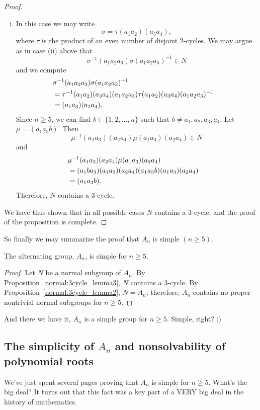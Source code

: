{\begin{proof}
\begin{enumerate}[(i)]
\item 
In this case we may write
\[
\sigma = \tau (a_1 a_2) (a_3 a_4),
\]
where $\tau$ is the product of an even number of disjoint 2-cycles.
We may argue as in case (ii) above that
\[
\sigma^{-1}(a_1 a_2 a_3)\sigma(a_1 a_2 a_3)^{-1} \in N
\]
and we compute
\begin{align*}
\lefteqn{\sigma^{-1}(a_1 a_2 a_3)\sigma(a_1 a_2 a_3)^{-1} } \\
& = \tau^{-1} (a_1 a_2) (a_3 a_4) (a_1 a_2 a_3) 
      \tau (a_1 a_2)(a_3 a_4)(a_1 a_2 a_3)^{-1} \\
& = (a_1 a_3)(a_2 a_4).
\end{align*}
Since $n \geq 5$, we can find $b \in \{1, 2, \ldots, n \}$ such that
$b \neq a_1, a_2, a_3, a_4$. Let $\mu = (a_1 a_3 b)$. Then
\[
\mu^{-1} (a_1 a_3)(a_2 a_4) \mu (a_1 a_3)(a_2 a_4) \in N
\]
and
\begin{align*}
\lefteqn{\mu^{-1} (a_1 a_3)(a_2 a_4) \mu (a_1 a_3)(a_2 a_4) } \\
& = (a_1 b a_3)(a_1 a_3)(a_2 a_4) 
      (a_1 a_3 b)(a_1 a_3)(a_2 a_4) \\
& = (a_1 a_3 b ).
\end{align*}
Therefore, $N$ contains a 3-cycle. 
\end{enumerate}
We have thus shown that in all possible cases $N$ contains a 3-cycle, and the  proof of the
proposition is complete.  
\end{proof}
 
So finally we may summarize the proof that $A_n$ is simple $(n \geq 5)$.

\begin{thm}\label{normal:An_simple}
The alternating group, $A_n$, is simple for $n \geq 5$. 
\end{thm}
 
\begin{proof}
Let $N$ be a normal subgroup of $A_n$. By Proposition~\ref{normal:3cycle_lemma3}, $N$ contains a
3-cycle. By Proposition~\ref{normal:3cycle_lemma2}, $N = A_n$; therefore, $A_n$ contains no proper
nontrivial normal subgroups for $n \geq 5$.
\end{proof} 
 
And there we have it, $A_n$ is a simple group for $n \geq 5$.  Simple, right? :)

\subsection{The simplicity of $A_n$ and nonsolvability of polynomial roots}
 We've just spent several pages proving that $A_n$ is simple for $n \ge 5$.  What's the big deal? It turns out that this fact was a key part of a VERY big deal in the history of mathematics.

}
